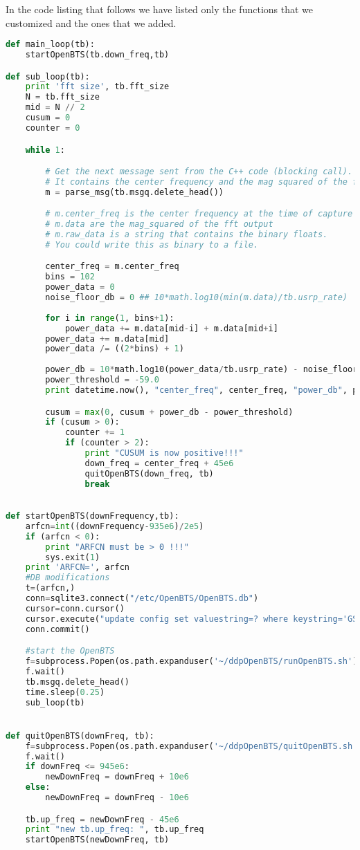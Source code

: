 In the code listing that follows we have listed only the functions that we
customized and the ones that we added.

\begin{lstlisting}[language=Python]
def main_loop(tb):
    startOpenBTS(tb.down_freq,tb)

def sub_loop(tb):
    print 'fft size', tb.fft_size
    N = tb.fft_size
    mid = N // 2
    cusum = 0
    counter = 0

    while 1:

        # Get the next message sent from the C++ code (blocking call).
        # It contains the center frequency and the mag squared of the fft
        m = parse_msg(tb.msgq.delete_head())

        # m.center_freq is the center frequency at the time of capture
        # m.data are the mag_squared of the fft output
        # m.raw_data is a string that contains the binary floats.
        # You could write this as binary to a file.

        center_freq = m.center_freq
        bins = 102
        power_data = 0
        noise_floor_db = 0 ## 10*math.log10(min(m.data)/tb.usrp_rate)
        
        for i in range(1, bins+1):
            power_data += m.data[mid-i] + m.data[mid+i]
        power_data += m.data[mid]
        power_data /= ((2*bins) + 1)
        
        power_db = 10*math.log10(power_data/tb.usrp_rate) - noise_floor_db
        power_threshold = -59.0
        print datetime.now(), "center_freq", center_freq, "power_db", power_db

        cusum = max(0, cusum + power_db - power_threshold)
        if (cusum > 0):
            counter += 1
            if (counter > 2):
                print "CUSUM is now positive!!!"
                down_freq = center_freq + 45e6
                quitOpenBTS(down_freq, tb)
                break

                
def startOpenBTS(downFrequency,tb):
    arfcn=int((downFrequency-935e6)/2e5)
    if (arfcn < 0):
        print "ARFCN must be > 0 !!!"
        sys.exit(1)
    print 'ARFCN=', arfcn
    #DB modifications
    t=(arfcn,)
    conn=sqlite3.connect("/etc/OpenBTS/OpenBTS.db")
    cursor=conn.cursor()
    cursor.execute("update config set valuestring=? where keystring='GSM.Radio.C0'",t)
    conn.commit()

    #start the OpenBTS
    f=subprocess.Popen(os.path.expanduser('~/ddpOpenBTS/runOpenBTS.sh'))
    f.wait()
    tb.msgq.delete_head()
    time.sleep(0.25)
    sub_loop(tb)


def quitOpenBTS(downFreq, tb):
    f=subprocess.Popen(os.path.expanduser('~/ddpOpenBTS/quitOpenBTS.sh'))
    f.wait()
    if downFreq <= 945e6:
        newDownFreq = downFreq + 10e6
    else:
        newDownFreq = downFreq - 10e6

    tb.up_freq = newDownFreq - 45e6
    print "new tb.up_freq: ", tb.up_freq
    startOpenBTS(newDownFreq, tb)
\end{lstlisting}


